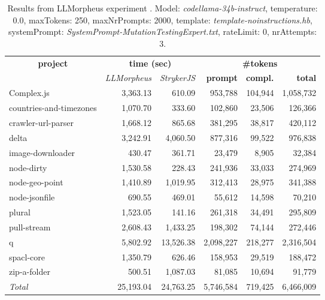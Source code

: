 
\begin{table*}[hbt!]
\centering
{\scriptsize
\begin{tabular}{l||r|r|r|r|r}
\multicolumn{1}{c|}{\bf project} & \multicolumn{2}{|c|}{\bf time (sec)} & \multicolumn{3}{|c|}{\bf \#tokens} \\
               & {\it LLMorpheus} & {\it StrykerJS} & {\bf prompt} & {\bf compl.} & {\bf total} \\
\hline
  Complex.js & 3,363.13 & 610.09 & 953,788 & 104,944 & 1,058,732 \\ 
countries-and-timezones & 1,070.70 & 333.60 & 102,860 & 23,506 & 126,366 \\ 
crawler-url-parser & 1,668.12 & 865.68 & 381,295 & 38,817 & 420,112 \\ 
delta & 3,242.91 & 4,060.50 & 877,316 & 99,522 & 976,838 \\ 
image-downloader & 430.47 & 361.71 & 23,479 & 8,905 & 32,384 \\ 
node-dirty & 1,530.58 & 228.43 & 241,936 & 33,033 & 274,969 \\ 
node-geo-point & 1,410.89 & 1,019.95 & 312,413 & 28,975 & 341,388 \\ 
node-jsonfile & 690.55 & 469.01 & 55,612 & 14,598 & 70,210 \\ 
plural & 1,523.05 & 141.16 & 261,318 & 34,491 & 295,809 \\ 
pull-stream & 2,608.43 & 1,433.25 & 198,302 & 74,144 & 272,446 \\ 
q & 5,802.92 & 13,526.38 & 2,098,227 & 218,277 & 2,316,504 \\ 
spacl-core & 1,350.79 & 626.46 & 158,953 & 29,519 & 188,472 \\ 
zip-a-folder & 500.51 & 1,087.03 & 81,085 & 10,694 & 91,779 \\ 
\hline
  \textit{Total} & 25,193.04 & 24,763.25 & 5,746,584 & 719,425 & 6,466,009 \\
  \end{tabular}
  }
  \\[2mm]
  \caption{Results from LLMorpheus experiment .
    Model: \textit{codellama-34b-instruct}, 
    temperature: 0.0, 
    maxTokens: 250, 
    maxNrPrompts: 2000, 
    template: \textit{template-noinstructions.hb}, 
    systemPrompt: \textit{SystemPrompt-MutationTestingExpert.txt}, 
    rateLimit: 0, 
    nrAttempts: 3.  
  }
  \label{table:Cost:run378:codellama-34b-instruct:template-noinstructions.hb:0.0}
\end{table*}